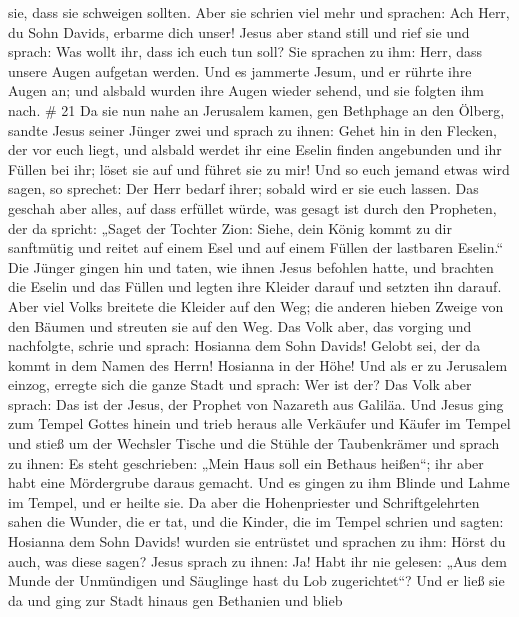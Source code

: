 sie, dass sie schweigen sollten. Aber sie schrien viel mehr und
sprachen: Ach Herr, du Sohn Davids, erbarme dich unser! 
Jesus aber stand still und rief sie und sprach: Was wollt ihr, dass ich
euch tun soll?  Sie sprachen zu ihm: Herr, dass unsere
Augen aufgetan werden.  Und es jammerte Jesum, und er
rührte ihre Augen an; und alsbald wurden ihre Augen wieder sehend, und
sie folgten ihm nach. \# 21  Da sie nun nahe an Jerusalem
kamen, gen Bethphage an den Ölberg, sandte Jesus seiner Jünger zwei
 und sprach zu ihnen: Gehet hin in den Flecken, der vor euch
liegt, und alsbald werdet ihr eine Eselin finden angebunden und ihr
Füllen bei ihr; löset sie auf und führet sie zu mir!  Und so
euch jemand etwas wird sagen, so sprechet: Der Herr bedarf ihrer; sobald
wird er sie euch lassen.  Das geschah aber alles, auf dass
erfüllet würde, was gesagt ist durch den Propheten, der da spricht:
 „Saget der Tochter Zion: Siehe, dein König kommt zu dir
sanftmütig und reitet auf einem Esel und auf einem Füllen der lastbaren
Eselin.``  Die Jünger gingen hin und taten, wie ihnen Jesus
befohlen hatte,  und brachten die Eselin und das Füllen und
legten ihre Kleider darauf und setzten ihn darauf.  Aber
viel Volks breitete die Kleider auf den Weg; die anderen hieben Zweige
von den Bäumen und streuten sie auf den Weg.  Das Volk aber,
das vorging und nachfolgte, schrie und sprach: Hosianna dem Sohn Davids!
Gelobt sei, der da kommt in dem Namen des Herrn! Hosianna in der Höhe!
 Und als er zu Jerusalem einzog, erregte sich die ganze
Stadt und sprach: Wer ist der?  Das Volk aber sprach: Das
ist der Jesus, der Prophet von Nazareth aus Galiläa.  Und
Jesus ging zum Tempel Gottes hinein und trieb heraus alle Verkäufer und
Käufer im Tempel und stieß um der Wechsler Tische und die Stühle der
Taubenkrämer  und sprach zu ihnen: Es steht geschrieben:
„Mein Haus soll ein Bethaus heißen``; ihr aber habt eine Mördergrube
daraus gemacht.  Und es gingen zu ihm Blinde und Lahme im
Tempel, und er heilte sie.  Da aber die Hohenpriester und
Schriftgelehrten sahen die Wunder, die er tat, und die Kinder, die im
Tempel schrien und sagten: Hosianna dem Sohn Davids! wurden sie
entrüstet  und sprachen zu ihm: Hörst du auch, was diese
sagen? Jesus sprach zu ihnen: Ja! Habt ihr nie gelesen: „Aus dem Munde
der Unmündigen und Säuglinge hast du Lob zugerichtet``? 
Und er ließ sie da und ging zur Stadt hinaus gen Bethanien und blieb
